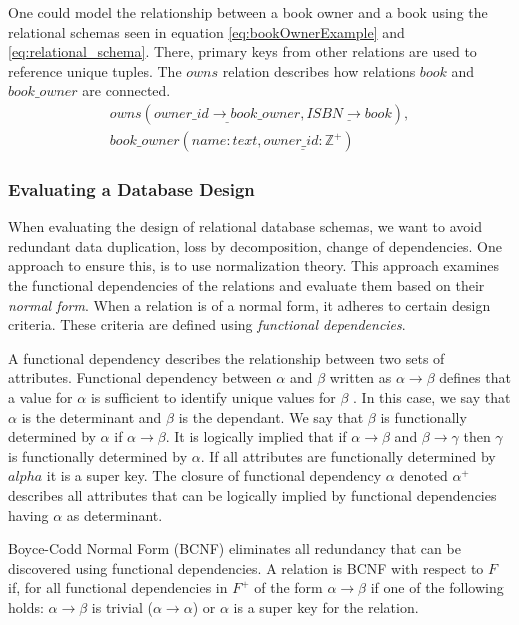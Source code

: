 One could model the relationship between a book owner and a book using the relational schemas seen in equation \ref{eq:bookOwnerExample} and \ref{eq:relational_schema}.
There, primary keys from other relations are used to reference unique tuples. The $owns$ relation describes how relations $book$ and $book\_owner$ are connected. 
\begin{equation}\label{eq:bookOwnerExample}
    \begin{split}
        owns(\underline{owner\_id \rightarrow book\_owner}, \underline{ISBN \rightarrow book}), \\
        book\_owner(name:text,\underline{owner\_id:\mathbb{Z}^+})
    \end{split}
\end{equation}

\subsubsection*{Evaluating a Database Design}
When evaluating the design of relational database schemas, we want to avoid redundant data duplication, loss by decomposition, change of dependencies\cite{DBSBook}.
One approach to ensure this, is to use normalization theory\cite{DBSBook}. This approach examines the functional dependencies of the relations and evaluate them based on their \textit{normal form}.
When a relation is of a normal form, it adheres to certain design criteria. These criteria are defined using \textit{functional dependencies}.

A functional dependency describes the relationship between two sets of attributes. 
Functional dependency between $\alpha$ and $\beta$ written as $\alpha \rightarrow \beta$ defines that a value for $\alpha$ is sufficient to identify unique values for $\beta$ \cite{DBSBook}.
In this case, we say that $\alpha$ is the determinant and $\beta$ is the dependant. 
We say that $\beta$ is functionally determined by $\alpha$ if $\alpha \rightarrow \beta$.
It is logically implied that if $\alpha \rightarrow \beta$ and $\beta \rightarrow \gamma$ then $\gamma$ is functionally determined by $\alpha$.
If all attributes are functionally determined by $alpha$ it is a super key\cite{DBSBook}.
The closure of functional dependency $\alpha$ denoted $\alpha^+$ describes all attributes that can be logically implied by functional dependencies having $\alpha$ as determinant\cite{DBSBook}. 

Boyce-Codd Normal Form (BCNF) eliminates all redundancy that can be discovered using functional dependencies\cite{DBSBook}. 
A relation is BCNF with respect to $F$ if, for all functional dependencies in $F^+$ of the form $\alpha \rightarrow \beta$ if one of the following holds:
$\alpha \rightarrow \beta$ is trivial ($\alpha \rightarrow \alpha$) or $\alpha$ is a super key for the relation.

